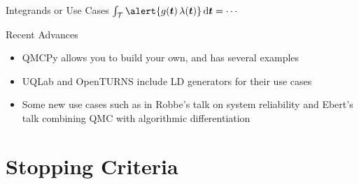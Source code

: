 \documentclass[11pt,compress,xcolor={usenames,dvipsnames},aspectratio=169]{beamer}
\begin{document}
\begin{frame}{Integrands or Use Cases $	\int_{\ct} \alert{g(\vt) \, \lambda(\vt)} \, \dif \vt = \cdots$}
	
	\begin{multicols}{2}
		{\Large \alert{Recent Advances}}
		\begin{itemize}
			\item QMCPy allows you to build your own, and has several examples
			
			\item UQLab and OpenTURNS include LD generators for their use cases
			
			\item Some new use cases such as in Robbe's talk \cite{Vro19a} on system reliability and Ebert's talk combining QMC with algorithmic differentiation
			
		\end{itemize}
		
		\columnbreak
		
		
	\end{multicols}
\end{frame}

	
\section{Stopping Criteria}
\end{document}
